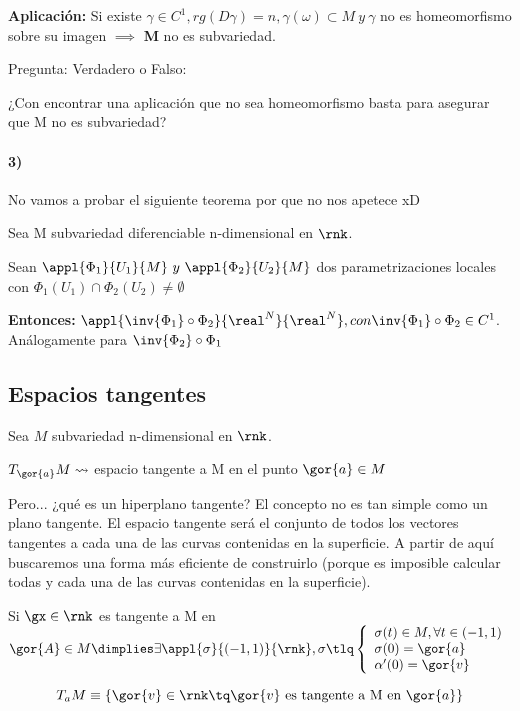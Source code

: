 \textbf{Aplicación:} Si existe $\gamma \in C^1, rg(D\gamma) = n, \gamma(\omega)\subset M \ y \ \gamma
$ no es homeomorfismo sobre su imagen $\implies$ \textbf{M} no es subvariedad.

Pregunta: Verdadero o Falso:

¿Con encontrar una aplicación que no sea homeomorfismo basta para asegurar que M no es subvariedad?

\paragraph{3)\\}

No vamos a probar el siguiente teorema por que no nos apetece xD

\begin{theorem}
Sea M subvariedad diferenciable n-dimensional en $\rnk$.

Sean $\appl{\Phi_1}{U_1}{M} \ y \ \appl{\Phi_2}{U_2}{M}$ dos parametrizaciones locales con $\Phi_1(U_1)\cap \Phi_2(U_2)\neq \emptyset$

\textbf{Entonces:} $\appl{\inv{\Phi_1}\circ \Phi_2}{\real^N}{\real^N}, con \inv{\Phi_1}\circ \Phi_2 \in C^1$. Análogamente para $\inv{\Phi_2}\circ\Phi_1$
\end{theorem}

\subsection{Espacios tangentes}

Sea $M$ subvariedad n-dimensional en $\rnk$.

$T_{\gor{a}}M \leadsto$ espacio tangente a M en el punto $\gor{a}\in M$

Pero... ¿qué es un hiperplano tangente? El concepto no es tan simple como un plano tangente. El espacio tangente será el conjunto de todos los vectores tangentes a cada una de las curvas contenidas en la superficie. A partir de aquí buscaremos una forma más eficiente de construirlo (porque es imposible calcular todas y cada una de las curvas contenidas en la superficie).

\begin{defn}
Si $\gx \in \rnk$ es tangente a M en $\gor{A} \in M \dimplies \exists \appl{\sigma}{(-1,1)}{\rnk}, \sigma \tlq \left\{\begin{array}{lc}
\sigma(t) \in M, \forall t\in (-1,1)\\
\sigma(0) = \gor{a}\\
\alpha'(0) = \gor{v}
\end{array}\right.$
\end{defn}
\begin{defn}
\[T_aM \equiv \{ \gor{v} \in \rnk \tq \gor{v} \text{ es tangente a M en }\gor{a}\}\]
\end{defn}

